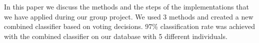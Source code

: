 In this paper we discuss the methods and the steps of the implementations that we have applied during our group project. We used 3 methods and created a new combined classifier based on voting decisions. 97\% classification rate was achieved with the combined classifier on our database with 5 different individuals.